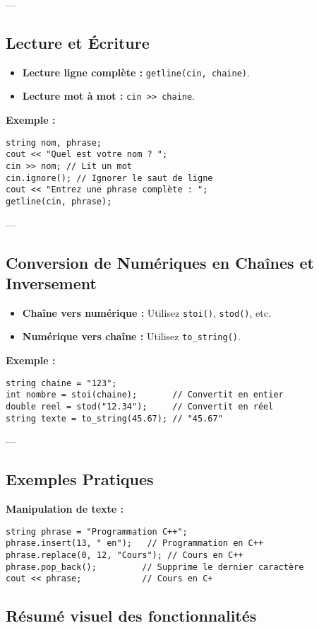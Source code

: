 ---

\subsection{ Lecture et Écriture}
\begin{itemize}
    \item \textbf{Lecture ligne complète :} \texttt{getline(cin, chaine)}.
    \item \textbf{Lecture mot à mot :} \texttt{cin >> chaine}.
\end{itemize}

\textbf{Exemple :}
\begin{tcolorbox}[colframe=blue!50!black, colback=blue!5!white, title=Exemple de Lecture et Écriture]
\begin{verbatim}
string nom, phrase;
cout << "Quel est votre nom ? ";
cin >> nom; // Lit un mot
cin.ignore(); // Ignorer le saut de ligne
cout << "Entrez une phrase complète : ";
getline(cin, phrase);
\end{verbatim}
\end{tcolorbox}

---

\subsection{ Conversion de Numériques en Chaînes et Inversement}
\begin{itemize}
    \item \textbf{Chaîne vers numérique :} Utilisez \texttt{stoi()}, \texttt{stod()}, etc.
    \item \textbf{Numérique vers chaîne :} Utilisez \texttt{to\_string()}.
\end{itemize}

\textbf{Exemple :}
\begin{tcolorbox}[colframe=blue!50!black, colback=blue!5!white, title=Exemple de Conversion]
\begin{verbatim}
string chaine = "123";
int nombre = stoi(chaine);       // Convertit en entier
double reel = stod("12.34");     // Convertit en réel
string texte = to_string(45.67); // "45.67"
\end{verbatim}
\end{tcolorbox}

---

\subsection{ Exemples Pratiques}
\textbf{Manipulation de texte :}
\begin{tcolorbox}[colframe=blue!50!black, colback=blue!5!white, title=Exemple de Manipulation de Texte]
\begin{verbatim}
string phrase = "Programmation C++";
phrase.insert(13, " en");   // Programmation en C++
phrase.replace(0, 12, "Cours"); // Cours en C++
phrase.pop_back();         // Supprime le dernier caractère
cout << phrase;            // Cours en C+
\end{verbatim}
\end{tcolorbox}

\subsection{ Résumé visuel des fonctionnalités}
\begin{center}
\end{center}
